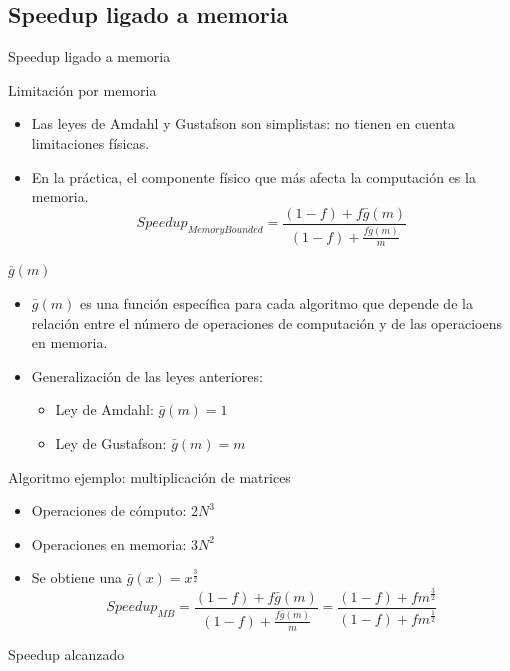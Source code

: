 \documentclass[utf8]{beamer}
\begin{document}
\subsection*{Speedup ligado a memoria}

\begin{frame}[allowframebreaks]{Speedup ligado a memoria}
    \begin{block}{Limitación por memoria}
        \begin{itemize}
        \item Las leyes de Amdahl y Gustafson son simplistas: no tienen en cuenta limitaciones físicas.
        \item En la práctica, el componente físico que más afecta la computación es la memoria.
        $$ Speedup_{MemoryBounded} = \frac{(1-f) + f \bar{g}(m)}{(1-f) + \frac{f\bar{g}(m)}{m}} $$
        \end{itemize}
    \end{block}
    \begin{block}{$\bar{g}(m)$}
        \begin{itemize}
            \item $\bar{g}(m)$ es una función específica para cada algoritmo que depende de la relación entre el número de operaciones de computación y de las operacioens en memoria.
            \item Generalización de las leyes anteriores:
            \begin{itemize}
                \item Ley de Amdahl: $\bar{g}(m) = 1$
                \item Ley de Gustafson: $\bar{g}(m) = m$
            \end{itemize}
        \end{itemize}
    \end{block}
    \begin{block}{Algoritmo ejemplo: multiplicación de matrices}
        \begin{itemize}
            \item Operaciones de cómputo: $2N^3$
            \item Operaciones en memoria: $3N^2$
            \item Se obtiene una $\bar{g}(x) = x^\frac{3}{2}$
            $$ Speedup_{MB} = \frac{(1-f) + f \bar{g}(m)}{(1-f) + \frac{f\bar{g}(m)}{m}} = \frac{(1-f) + f m^\frac{3}{2}}{(1-f) + fm^\frac{1}{2}} $$
        \end{itemize}
    \end{block}
    \begin{block}{Speedup alcanzado}

\end{block}
\end{frame}
\end{document}
